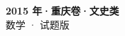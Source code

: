 \documentclass[zihao=-4, a4paper]{ctexart}
\begin{document}
\begin{center}
  {\Large\bfseries 2015 年·重庆卷·文史类}\\[4pt]
  {\large 数学 · 试题版}
\end{center}
\medskip
{}

\end{document}
